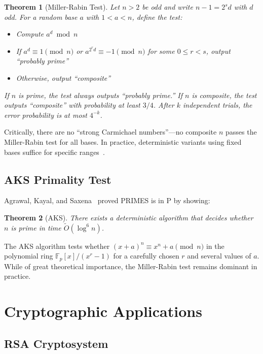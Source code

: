 \documentclass{amsart}
\theoremstyle{plain}
\newtheorem{theorem}{Theorem}[section]
\theoremstyle{definition}
\theoremstyle{remark}
\newcommand{\F}{\mathbb{F}}
\begin{document}
\begin{theorem}[Miller-Rabin Test]\label{thm:miller-rabin}
Let $n > 2$ be odd and write $n - 1 = 2^s d$ with $d$ odd. For a random base $a$ with $1 < a < n$, define the test:
\begin{itemize}
\item Compute $a^d \bmod n$
\item If $a^d \equiv 1 \pmod{n}$ or $a^{2^r d} \equiv -1 \pmod{n}$ for some $0 \le r < s$, output ``probably prime''
\item Otherwise, output ``composite''
\end{itemize}
If $n$ is prime, the test always outputs ``probably prime.'' If $n$ is composite, the test outputs ``composite'' with probability at least $3/4$. After $k$ independent trials, the error probability is at most $4^{-k}$.
\end{theorem}

Critically, there are no ``strong Carmichael numbers''---no composite $n$ passes the Miller-Rabin test for all bases. In practice, deterministic variants using fixed bases suffice for specific ranges~\cite{crandall2005}.

\subsection{AKS Primality Test}

Agrawal, Kayal, and Saxena~\cite{aks2004} proved PRIMES is in P by showing:

\begin{theorem}[AKS]\label{thm:aks}
There exists a deterministic algorithm that decides whether $n$ is prime in time $\tilde{O}(\log^6 n)$.
\end{theorem}

The AKS algorithm tests whether $(x + a)^n \equiv x^n + a \pmod{n}$ in the polynomial ring $\F_p[x]/(x^r - 1)$ for a carefully chosen $r$ and several values of $a$. While of great theoretical importance, the Miller-Rabin test remains dominant in practice.

\section{Cryptographic Applications}\label{sec:crypto}

\subsection{RSA Cryptosystem}
\end{document}
